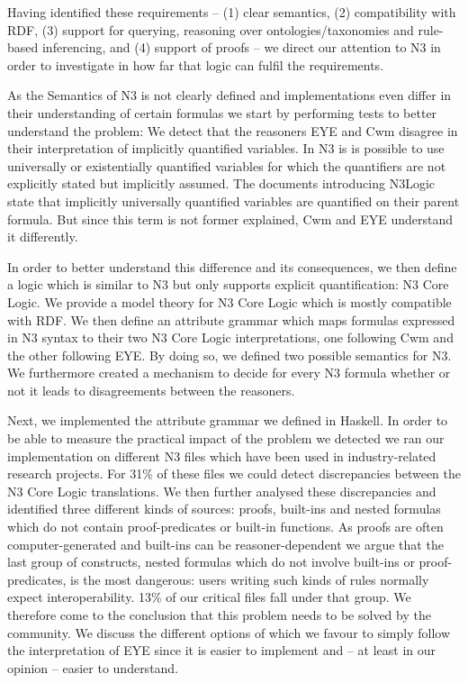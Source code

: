 Having identified these requirements -- (1) clear semantics, (2) compatibility with RDF, (3) support for querying, reasoning over ontologies/taxonomies and 
rule-based inferencing, and
(4) support of proofs -- we direct our attention to N3 in order to investigate in how far that logic can fulfil the requirements.

As the Semantics of N3 is not clearly defined and implementations even differ in their understanding of certain formulas we start by performing tests to better understand the 
problem: We detect that the reasoners EYE and Cwm disagree in their interpretation of implicitly quantified variables. In N3 is is possible to use universally or 
existentially quantified variables for which the quantifiers are not explicitly stated but implicitly assumed. The documents 
introducing N3Logic state that implicitly universally quantified variables are quantified on their parent formula. But since this term 
is not former explained, Cwm and EYE understand it differently.

In order to better understand this difference and its consequences, we then define a logic which is similar to N3 but only supports explicit quantification: N3 Core Logic.
We provide a model theory for N3 Core Logic which is mostly compatible with RDF. We then define an attribute grammar which maps formulas expressed in N3 syntax to their two
N3 Core Logic interpretations, one following Cwm and the other following EYE. By doing so, we defined two possible semantics for N3. 
We furthermore created a mechanism to decide for every N3 formula whether or not it leads to disagreements between the reasoners.

Next, we implemented the attribute grammar we defined in Haskell. In order to be able to measure the practical impact of the problem we detected we ran our 
implementation on different N3 files which have been used in industry-related research projects. For 31\% of these files we could detect discrepancies between the 
N3 Core Logic translations. We then further analysed these discrepancies and identified three different kinds of sources: proofs, built-ins and nested formulas 
which do not contain proof-predicates or built-in functions. 
As proofs are often computer-generated and  built-ins can be reasoner-dependent
we argue that the last group of constructs, nested formulas which do not involve built-ins or proof-predicates, is the most dangerous:
users writing such kinds of rules normally expect interoperability. 13\% of our critical files fall under that group.
We therefore come to the conclusion that this problem needs to be solved by the community. We discuss the different options of which we favour 
to simply follow the interpretation of EYE since it is easier to implement and -- at least in our opinion -- easier to understand.


